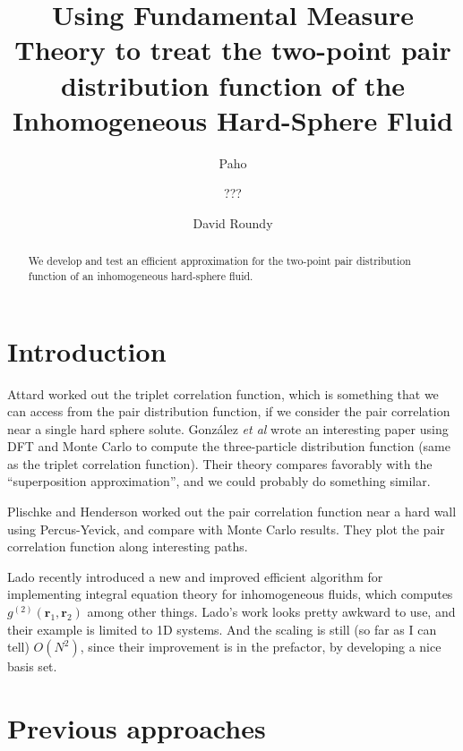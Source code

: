 \documentclass[letterpaper,twocolumn,amsmath,amssymb,pre]{revtex4-1}
\newcommand{\rr}{\textbf{r}}
\begin{document}
\title{Using Fundamental Measure Theory to treat the two-point pair
  distribution function of the Inhomogeneous Hard-Sphere Fluid}

\author{Paho}
\author{???}
\author{David Roundy}

\begin{abstract}
  We develop and test an efficient approximation for the two-point
  pair distribution function of an inhomogeneous hard-sphere fluid.
\end{abstract}


\section{Introduction}

Attard worked out the triplet correlation function, which is something
that we can access from the pair distribution function, if we consider
the pair correlation near a single hard sphere
solute\cite{attard1989spherically}.  Gonz\'alez \emph{et al} wrote an
interesting paper using DFT and Monte Carlo to compute the
three-particle distribution function (same as the triplet correlation
function)\cite{gonzalez1999test}.  Their theory compares favorably
with the ``superposition approximation'', and we could probably do
something similar.

Plischke and Henderson worked out the pair correlation function near a
hard wall using Percus-Yevick, and compare with Monte Carlo
results\cite{plischke1986pair}.  They plot the pair correlation
function along interesting paths.

Lado recently introduced a new and improved efficient algorithm for
implementing integral equation theory for inhomogeneous fluids, which
computes $g^{(2)}(\rr_1,\rr_2)$ among other
things\cite{lado2009efficient}.  Lado's work looks pretty awkward to
use, and their example is limited to 1D systems.  And the scaling is
still (so far as I can tell) $O(N^2)$, since their improvement is in
the prefactor, by developing a nice basis set.

\section{Previous approaches}
\end{document}
